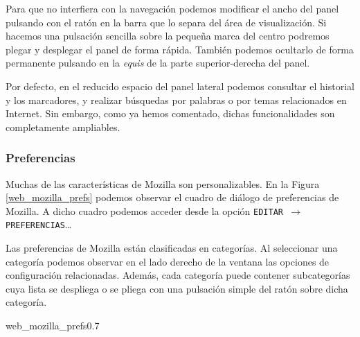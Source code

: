 Para que  no interfiera con  la navegación podemos modificar  el ancho
del panel pulsando con el ratón en  la barra que lo separa del área de
visualización.  Si hacemos  una  pulsación sencilla  sobre la  pequeña
marca del centro podremos plegar y desplegar el panel de forma rápida.
También  podemos ocultarlo  de forma  permanente pulsando  en la  {\em
equis} de la parte superior-derecha del panel.

Por  defecto,  en  el  reducido  espacio  del  panel  lateral  podemos
consultar  el historial  y los  marcadores, y  realizar búsquedas  por
palabras o  por temas relacionados  en Internet. Sin embargo,  como ya
hemos comentado, dichas funcionalidades son completamente ampliables.

\subsubsection{Preferencias}

Muchas de las características de {\sf Mozilla} son personalizables. En
la  Figura  \ref{web_mozilla_prefs}  podemos  observar  el  cuadro  de
diálogo  de preferencias  de  {\sf Mozilla}.  A  dicho cuadro  podemos
acceder desde la opción {\tt EDITAR $\rightarrow$ PREFERENCIAS}\dots

Las preferencias de {\sf Mozilla} están clasificadas en categorías. Al
seleccionar una  categoría podemos observar  en el lado derecho  de la
ventana  las  opciones  de configuración  relacionadas.  Además,  cada
categoría puede  contener subcategorías cuya  lista se despliega  o se
pliega con una pulsación simple del ratón sobre dicha categoría.

\begin{figura}{web_mozilla_prefs}{0.7}
\caption{Cuadro de diálogo de preferencias de Mozilla}
\label{web_mozilla_prefs}
\end{figura}

